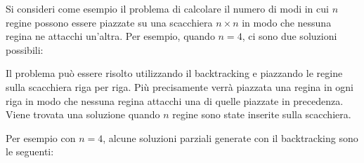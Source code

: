 
Si consideri come esempio il problema
di calcolare il numero di modi
in cui $n$ regine possono essere piazzate
su una scacchiera $n \times n$ in modo che
nessuna regina ne attacchi un'altra.
Per esempio, quando $n=4$,
ci sono due soluzioni possibili:

\begin{center}
\end{center}

Il problema può essere risolto utilizzando il backtracking
e piazzando le regine sulla scacchiera riga per riga.
Più precisamente verrà piazzata una regina in ogni riga 
in modo che nessuna regina attacchi una di quelle piazzate in precedenza.
Viene trovata una soluzione quando 
$n$ regine sono state inserite sulla scacchiera.

Per esempio con $n=4$,
alcune soluzioni parziali generate con il backtracking
sono le seguenti:

